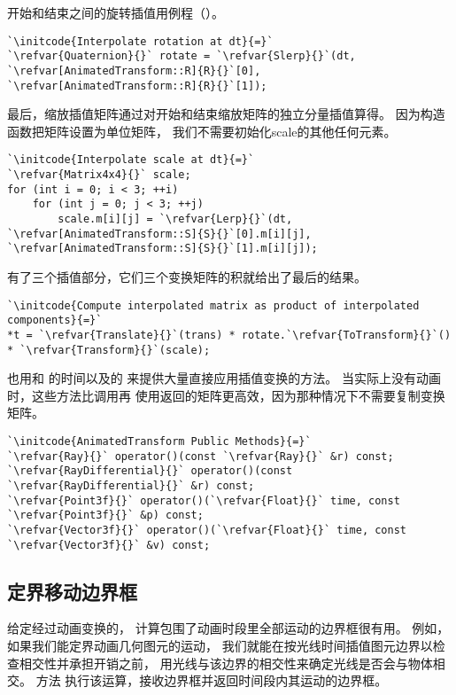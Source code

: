 开始和结束之间的旋转插值用例程（）。
\begin{lstlisting}
`\initcode{Interpolate rotation at dt}{=}`
`\refvar{Quaternion}{}` rotate = `\refvar{Slerp}{}`(dt, `\refvar[AnimatedTransform::R]{R}{}`[0], `\refvar[AnimatedTransform::R]{R}{}`[1]);
\end{lstlisting}

最后，缩放插值矩阵通过对开始和结束缩放矩阵的独立分量插值算得。
因为构造函数把矩阵设置为单位矩阵，
我们不需要初始化{\ttfamily scale}的其他任何元素。
\begin{lstlisting}
`\initcode{Interpolate scale at dt}{=}`
`\refvar{Matrix4x4}{}` scale;
for (int i = 0; i < 3; ++i)
    for (int j = 0; j < 3; ++j)
        scale.m[i][j] = `\refvar{Lerp}{}`(dt, `\refvar[AnimatedTransform::S]{S}{}`[0].m[i][j], `\refvar[AnimatedTransform::S]{S}{}`[1].m[i][j]);
\end{lstlisting}

有了三个插值部分，它们三个变换矩阵的积就给出了最后的结果。
\begin{lstlisting}
`\initcode{Compute interpolated matrix as product of interpolated components}{=}`
*t = `\refvar{Translate}{}`(trans) * rotate.`\refvar{ToTransform}{}`() * `\refvar{Transform}{}`(scale);
\end{lstlisting}

也用和
的时间以及的
来提供大量直接应用插值变换的方法。
当实际上没有动画时，这些方法比调用再
使用返回的矩阵更高效，因为那种情况下不需要复制变换矩阵。
\begin{lstlisting}
`\initcode{AnimatedTransform Public Methods}{=}`
`\refvar{Ray}{}` operator()(const `\refvar{Ray}{}` &r) const;
`\refvar{RayDifferential}{}` operator()(const `\refvar{RayDifferential}{}` &r) const;
`\refvar{Point3f}{}` operator()(`\refvar{Float}{}` time, const `\refvar{Point3f}{}` &p) const;
`\refvar{Vector3f}{}` operator()(`\refvar{Float}{}` time, const `\refvar{Vector3f}{}` &v) const;
\end{lstlisting}

\subsection{定界移动边界框}\label{sub:定界移动边界框}
给定经过动画变换的，
计算包围了动画时段里全部运动的边界框很有用。
例如，如果我们能定界动画几何图元的运动，
我们就能在按光线时间插值图元边界以检查相交性并承担开销之前，
用光线与该边界的相交性来确定光线是否会与物体相交。
方法
执行该运算，接收边界框并返回时间段内其运动的边界框。

